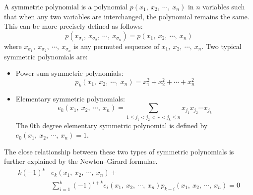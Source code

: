 \documentclass[a4paper]{report}
\begin{document}
A symmetric polynomial is a polynomial $p(x_1,\ x_2,\ \cdots,\ x_n)$
in $n$ variables such that when any two variables are interchanged,
the polynomial remains the same. This can be
more precisely defined as follows:
\begin{equation}
p(x_{\sigma_1},\ x_{\sigma_2},\ \cdots,\ x_{\sigma_n})=p(x_1,\ x_2,\ \cdots,\ x_n)
\end{equation}
where $x_{\sigma_1},\ x_{\sigma_2},\ \cdots,\ x_{\sigma_n}$ is any permuted sequence of $x_1,\ x_2,\ \cdots,\ x_n$. Two typical symmetric polynomials are:
\begin{itemize}
	\item Power sum symmetric polynomials: 
	\begin{equation}
		p_k(x_1,\ x_2,\ \cdots,\ x_n)=x_1^2+x_2^2+\cdots+x_n^2
	\end{equation}
	\item Elementary symmetric polynomials:
	\begin{equation}
		e_k(x_1,\ x_2,\ \cdots,\ x_n)=\underset{1 \leq j_1<j_2<\cdots<j_k\leq n}{\sum}{x_{j_1}x_{j_2}\cdots x_{j_k}}
	\end{equation}
	The 0th degree elementary symmetric polynomial is defined by $e_0(x_1,\ x_2,\ \cdots,\ x_n) = 1$.
\end{itemize}
The close relationship between these two types of symmetric polynomials is further
explained by the Newton–Girard formulae.
\begin{align}
k(-1)^{k}&e_k(x_1,\ x_2,\ \cdots,\ x_n)+ \nonumber \\
&\sum_{i=1}^{k}{(-1)^{i+k}e_i(x_1,\ x_2,\ \cdots,\ x_n)p_{k-i}(x_1,\ x_2,\ \cdots,\ x_n)} = 0
\end{align}
\end{document}
